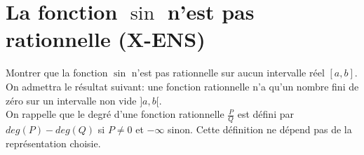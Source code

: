 \documentclass{article}
\begin{document}
\section{La fonction $\sin$ n'est pas rationnelle (X-ENS)}
Montrer que la fonction $\sin$ n'est pas rationnelle sur aucun intervalle r\'eel $[a,b]$.\\
On admettra le r\'esultat suivant: une fonction rationnelle n'a qu'un nombre fini de z\'ero sur un intervalle non vide $]a,b[$.\\
On rappelle que le degr\'e d'une fonction rationnelle $\frac{P}{Q}$ est d\'efini par $deg(P)-deg(Q)$ si $P\neq 0$ et $-\infty$ sinon. Cette d\'efinition ne d\'epend pas de la repr\'esentation choisie.
\end{document}
